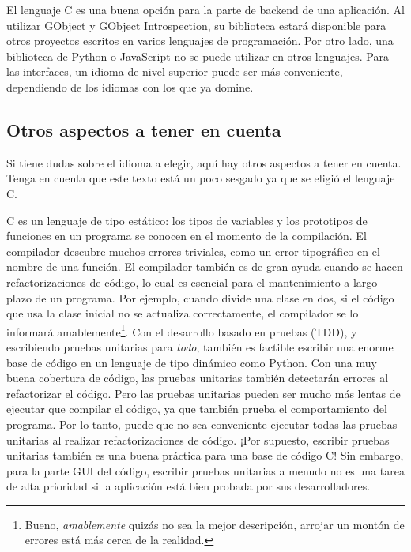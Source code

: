 El lenguaje C es una buena opción para la parte de backend de una aplicación. Al utilizar GObject y GObject Introspection, su biblioteca estará disponible para otros proyectos escritos en varios lenguajes de programación. Por otro lado, una biblioteca de Python o JavaScript no se puede utilizar en otros lenguajes. Para las interfaces, un idioma de nivel superior puede ser más conveniente, dependiendo de los idiomas con los que ya domine.

\subsection{Otros aspectos a tener en cuenta}
Si tiene dudas sobre el idioma a elegir, aquí hay otros aspectos a tener en cuenta. Tenga en cuenta que este texto está un poco sesgado ya que se eligió el lenguaje C.

C es un lenguaje de tipo estático: los tipos de variables y los prototipos de funciones en un programa se conocen en el momento de la compilación. El compilador descubre muchos errores triviales, como un error tipográfico en el nombre de una función. El compilador también es de gran ayuda cuando se hacen refactorizaciones de código, lo cual es esencial para el mantenimiento a largo plazo de un programa. Por ejemplo, cuando divide una clase en dos, si el código que usa la clase inicial no se actualiza correctamente, el compilador se lo informará amablemente\footnote{Bueno, \emph{amablemente} quizás no sea la mejor descripción, arrojar un montón de errores está más cerca de la realidad.}. Con el desarrollo basado en pruebas (TDD), y escribiendo pruebas unitarias para \emph{todo}, también es factible escribir una enorme base de código en un lenguaje de tipo dinámico como Python. Con una muy buena cobertura de código, las pruebas unitarias también detectarán errores al refactorizar el código. Pero las pruebas unitarias pueden ser mucho más lentas de ejecutar que compilar el código, ya que también prueba el comportamiento del programa. Por lo tanto, puede que no sea conveniente ejecutar todas las pruebas unitarias al realizar refactorizaciones de código. ¡Por supuesto, escribir pruebas unitarias también es una buena práctica para una base de código C! Sin embargo, para la parte GUI del código, escribir pruebas unitarias a menudo no es una tarea de alta prioridad si la aplicación está bien probada por sus desarrolladores.

